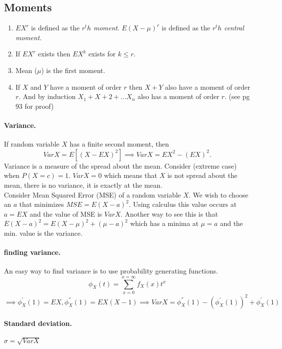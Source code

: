 \documentclass{article}
\begin{document}
	\subsection{Moments}
	\begin{enumerate}
		\item $EX^r$ is defined as the \emph{$r^th$ moment}. $E(X-\mu)^r$ is defined as the \emph{$r^th$ central moment.}
		\item If $EX^r$ exists then $EX^k$ exists for $k \leq r$.
		\item Mean ($\mu$) is the first moment.
		\item If $X$ and $Y$ have a moment of order $r$ then $X + Y$ also have a moment of order $r$. And by induction $X_1 + X+2 + ... X_n$ 
		also has a moment of order $r$. (see pg 93 for proof)
	\end{enumerate}
	\paragraph{Variance.} If random variable $X$ has a finite second moment, then \[Var X = E[(X - EX)^2] \implies Var X = EX^2 - (EX)^2.\]
	Variance is a measure of the spread about the mean. Consider (extreme case) when $P(X = c) = 1$. $Var X = 0$ which means that $X$ is
	not spread about the mean, there is no variance, it is exactly at the mean.\\
	Consider Mean Squared Error (MSE) of a random variable $X$. We wish to choose an $a$ that minimizes $MSE = E(X-a)^2$. Using calculus
	this value occurs at $a = EX$ and the value of MSE is $Var X$. Another way to see this is that $E(X-a)^2 = E(X-\mu)^2 + (\mu - a)^2$ which
	has a minima at $\mu = a$ and the min. value is the variance.
	\paragraph{finding variance.} An easy way to find variance is to use probability generating functions. \[\phi_X(t) = \sum_{x = 0}^{x = \infty} f_X(x)t^x\]
	\[\implies \phi^{'}_X(1) = EX, \phi^{''}_X(1) = EX(X-1) \implies Var X = \phi^{''}_X(1) - (\phi^{'}_X(1))^2 + \phi^{'}_X(1)\]
	\paragraph{Standard deviation.} $\sigma = \sqrt{Var X} $
\end{document}
